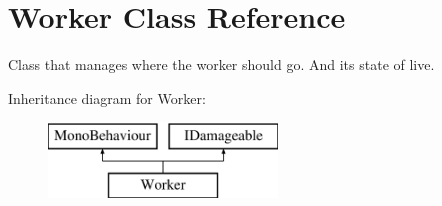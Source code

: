 \hypertarget{class_worker}{}\section{Worker Class Reference}
\label{class_worker}


Class that manages where the worker should go. And its state of live.  


Inheritance diagram for Worker\+:\begin{figure}[H]
\begin{center}
\leavevmode
\includegraphics[height=2.000000cm]{class_worker}
\end{center}
\end{figure}
